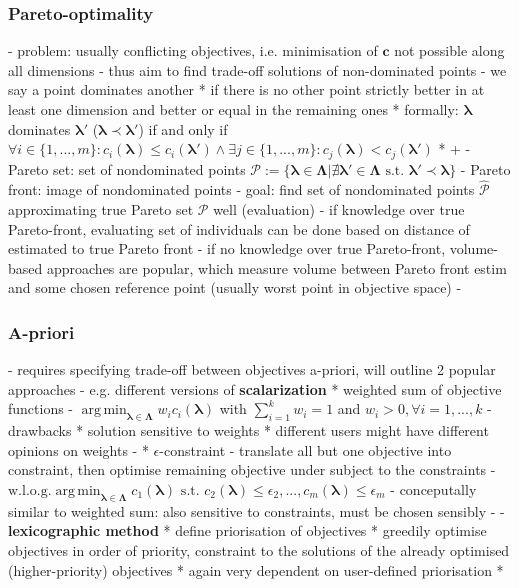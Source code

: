 \documentclass[twoside,11pt]{article}
\DeclareMathOperator*{\argmin}{arg\,min}
\begin{document}
\subsubsection{Pareto-optimality}
- problem: usually conflicting objectives, i.e. minimisation of $\boldsymbol{c}$ not possible along all dimensions
- thus aim to find trade-off solutions of non-dominated points
- we say a point dominates another
  * if there is no other point strictly better in at least one dimension and better or equal in the remaining ones
  * formally: $\boldsymbol\lambda$ dominates $\boldsymbol\lambda'$ ($\boldsymbol\lambda\prec\boldsymbol\lambda'$) if and only if
    $\forall i\in\{1,...,m\}:c_i(\boldsymbol\lambda) \le c_i(\boldsymbol\lambda') \wedge \exists j\in\{1,...,m\}:c_j(\boldsymbol\lambda) < c_j(\boldsymbol\lambda')$
  * \citep[pp. 7f]{10.1145/3610536} + \citep[pp. 198f]{genetic_algos}
- Pareto set: set of nondominated points $\mathcal{P}:=\{\boldsymbol\lambda\in\boldsymbol\Lambda|\nexists\boldsymbol\lambda'\in\boldsymbol\Lambda\text{ s.t. }\boldsymbol\lambda'\prec\boldsymbol\lambda\}$
- Pareto front: image of nondominated points
- goal: find set of nondominated points $\hat{\mathcal{P}}$ approximating true Pareto set $\mathcal{P}$ well
(evaluation)
- if knowledge over true Pareto-front, evaluating set of individuals can be done based on distance of estimated to true Pareto front
- if no knowledge over true Pareto-front, volume-based approaches are popular, which measure volume between Pareto front estim and some chosen
  reference point (usually worst point in objective space)
- \citep[pp. 8-10]{10.1145/3610536}
\subsubsection{A-priori}
- requires specifying trade-off between objectives a-priori, will outline 2 popular approaches
- e.g. different versions of \textbf{scalarization}
  * weighted sum of objective functions
    - $\argmin_{\boldsymbol\lambda\in\boldsymbol\Lambda} w_i c_i(\boldsymbol\lambda)$ with $\sum_{i=1}^k w_i=1$ and $w_i>0,\forall i=1,...,k$
    - drawbacks
      * solution sensitive to weights
      * different users might have different opinions on weights \citep[chap. 3.1]{NSGA}
    - \citep[p. 11]{10.1145/3610536}
  * $\epsilon$-constraint
    - translate all but one objective into constraint, then optimise remaining objective under subject to the constraints
    - $\text{w.l.o.g.} \argmin_{\boldsymbol\lambda\in\boldsymbol\Lambda} c_1(\boldsymbol\lambda) \text{ s.t. } c_2(\boldsymbol\lambda)\le\epsilon_2,...,c_m(\boldsymbol\lambda)\le\epsilon_m$
    - conceputally similar to weighted sum: also sensitive to constraints, must be chosen sensibly
    - \citep[p. 12]{10.1145/3610536}
- \textbf{lexicographic method}
  * define priorisation of objectives
  * greedily optimise objectives in order of priority, constraint to the solutions of the already optimised (higher-priority) objectives
  * again very dependent on user-defined priorisation
  * \citep[p. 13749]{lexicographic_MOO}  %
\end{document}
